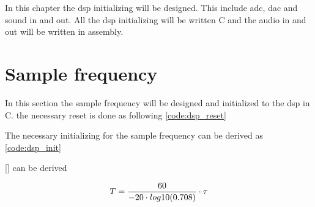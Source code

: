 \label{ch:disinit}
In this chapter the \gls{dsp} initializing will be designed. This include \gls{adc}, \gls{dac} and sound in and out. All the \gls{dsp} initializing will be written C and the audio in and out will be written in assembly. 

\section{Sample frequency}
In this section the sample frequency will be designed and initialized to the \gls{dsp} in C. 
the necessary reset is done as following \autoref{code:dsp_reset}


The necessary initializing for the sample frequency can be derived as \autoref{code:dsp_init}


\autoref{} can be derived  


\begin{equation}\label{eq:reverb_defined_tal}
       T = \frac{60}{-20 \cdot log10(0.708)} \cdot \tau
       \addunit{\si{\second}}
    \end{equation}
